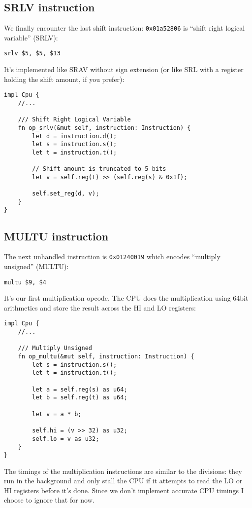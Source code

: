 \documentclass[a4paper]{article}
\newcommand{\code}[1] {\texttt{#1}}
\begin{document}
\subsection{SRLV instruction}

We finally encounter the last shift instruction: \code{0x01a52806} is
``shift right logical variable'' (SRLV):

\begin{lstlisting}[language=assembly]
srlv $5, $5, $13
\end{lstlisting}

It's implemented like SRAV without sign extension (or like SRL with a
register holding the shift amount, if you prefer):

\begin{lstlisting}
impl Cpu {
    //...

    /// Shift Right Logical Variable
    fn op_srlv(&mut self, instruction: Instruction) {
        let d = instruction.d();
        let s = instruction.s();
        let t = instruction.t();

        // Shift amount is truncated to 5 bits
        let v = self.reg(t) >> (self.reg(s) & 0x1f);

        self.set_reg(d, v);
    }
}
\end{lstlisting}

\subsection{MULTU instruction}

The next unhandled instruction is \code{0x01240019} which encodes
``multiply unsigned'' (MULTU):

\begin{lstlisting}[language=assembly]
multu $9, $4
\end{lstlisting}

It's our first multiplication opcode. The CPU does the multiplication
using 64bit arithmetics and store the result across the HI and LO
registers:

\begin{lstlisting}
impl Cpu {
    //...

    /// Multiply Unsigned
    fn op_multu(&mut self, instruction: Instruction) {
        let s = instruction.s();
        let t = instruction.t();

        let a = self.reg(s) as u64;
        let b = self.reg(t) as u64;

        let v = a * b;

        self.hi = (v >> 32) as u32;
        self.lo = v as u32;
    }
}
\end{lstlisting}

The timings of the multiplication instructions are similar to the
divisions: they run in the background and only stall the CPU if it
attempts to read the LO or HI registers before it's done. Since we
don't implement accurate CPU timings I choose to ignore that for now.

\newpage

\listoftables
\end{document}
